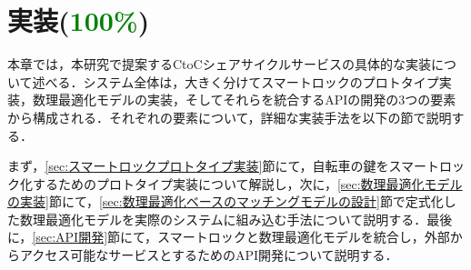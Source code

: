 \section{実装(\textcolor{green}{100\%})}
  \label{sec:実装}
    \par 本章では，本研究で提案するCtoCシェアサイクルサービスの具体的な実装について述べる．システム全体は，大きく分けてスマートロックのプロトタイプ実装，数理最適化モデルの実装，そしてそれらを統合するAPIの開発の3つの要素から構成される．それぞれの要素について，詳細な実装手法を以下の節で説明する．
    \par まず，\ref{sec:スマートロックプロトタイプ実装}節にて，自転車の鍵をスマートロック化するためのプロトタイプ実装について解説し，次に，\ref{sec:数理最適化モデルの実装}節にて，\ref{sec:数理最適化ベースのマッチングモデルの設計}節で定式化した数理最適化モデルを実際のシステムに組み込む手法について説明する．最後に，\ref{sec:API開発}節にて，スマートロックと数理最適化モデルを統合し，外部からアクセス可能なサービスとするためのAPI開発について説明する．
  

